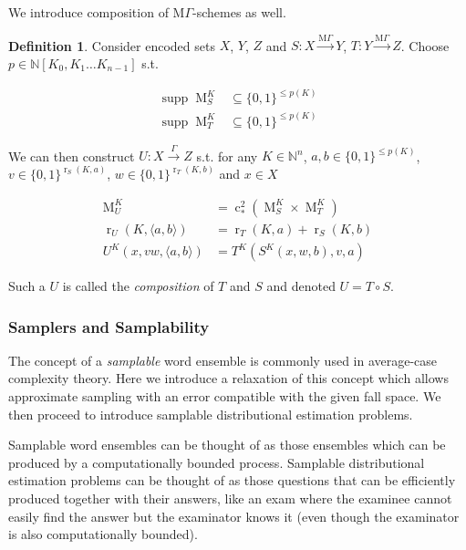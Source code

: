 \documentclass{article}
\numberwithin{equation}{section}
\theoremstyle{definition}
\newtheorem{definition}{Definition}[section]
\theoremstyle{plain}
\newcommand{\Bool}{\{0,1\}}
\DeclareMathOperator{\Supp}{supp}
\DeclareMathOperator{\R}{r}
\DeclareMathOperator{\M}{M}
\DeclareMathOperator{\En}{c}
\newcommand{\Nats}{\mathbb{N}}
\newcommand{\NatPoly}{\Nats[K_0, K_1 \ldots K_{n-1}]}
\newcommand{\Chev}[1]{\langle #1 \rangle}
\newcommand{\MGrow}{\mathrm{M}\Gamma}
\newcommand{\Scheme}{\xrightarrow{\Gamma}}
\newcommand{\MScheme}{\xrightarrow{\MGrow}}
\begin{document}
We introduce composition of ${\MGrow}$-schemes as well.

\begin{samepage}
\begin{definition}

Consider encoded sets $X$, $Y$, $Z$ and $S: X \MScheme Y$, $T: Y \MScheme Z$. Choose\\ ${p \in \NatPoly}$ s.t. 

\begin{align*}
\Supp \M_S^K &\subseteq \Bool^{\leq p(K)} \\
\Supp \M_T^K &\subseteq \Bool^{\leq p(K)}
\end{align*}

We can then construct $U: X \Scheme Z$ s.t. for any $K \in \Nats^n$, $a,b \in \Bool^{\leq p(K)}$, ${v \in \Bool^{\R_S(K,a)}}$, ${w \in \Bool^{\R_T(K,b)}}$ and $x \in X$

\begin{align}
\M_U^K &= \En_*^2(\M_S^K \times \M_T^K) \\
\R_U(K, \Chev{a,b}) &= \R_T(K,a)+\R_S(K,b) \\
U^K(x,vw,\Chev{a,b}) &= T^K(S^K(x,w,b),v,a)
\end{align}

Such a $U$ is called the \emph{composition} of $T$ and $S$ and denoted $U = T \circ S$.

\end{definition}
\end{samepage}

\subsubsection{Samplers and Samplability}

The concept of a \emph{samplable} word ensemble is commonly used in average-case complexity theory. Here we introduce a relaxation of this concept which allows approximate sampling with an error compatible with the given fall space. We then proceed to introduce samplable distributional estimation problems.

Samplable word ensembles can be thought of as those ensembles which can be produced by a computationally bounded process. Samplable distributional estimation problems can be thought of as those questions that can be efficiently produced together with their answers, like an exam where the examinee cannot easily find the answer but the examinator knows it (even though the examinator is also computationally bounded).
\end{document}
